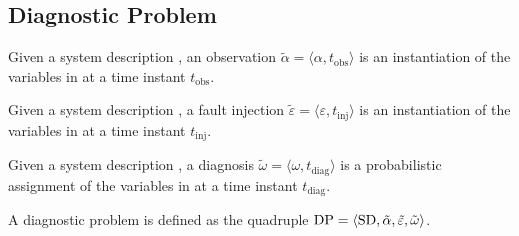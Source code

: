 \subsection{Diagnostic Problem}
%
\begin{definition}[Observation]
%
Given a system description \sd, an observation $\tilde\alpha =
\langle\alpha, t_{\mathrm{obs}}\rangle$ is an instantiation of the
variables in \obs at a time instant $t_{\mathrm{obs}}$.
%
\end{definition}
%
\begin{definition}
%
Given a system description \sd, a fault injection $\tilde{\varepsilon}
= \langle\varepsilon, t_{\mathrm{inj}}\rangle$ is an instantiation of
the variables in \comps at a time instant $t_{\mathrm{inj}}$.
%
\end{definition}
%
\begin{definition}[Diagnosis]
%
Given a system description \sd, a diagnosis $\tilde{\omega} =
\langle\omega, t_{\mathrm{diag}}\rangle$ is a probabilistic assignment
of the variables in \comps at a time instant $t_{\mathrm{diag}}$.
%
\end{definition}
%
\begin{definition}
%
A diagnostic problem \dproblem is defined as the quadruple $\mathrm{DP}
= \langle\mathrm{SD}, \tilde{\alpha}, \tilde{\varepsilon},
\tilde{\omega}\rangle$.
%
\end{definition}
%
